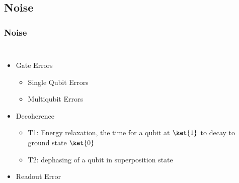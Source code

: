 \documentclass[aspectratio=169,11pt,hyperref={colorlinks=true}]{beamer}
\begin{document}
\subsection{Noise}
\begin{frame}
    \frametitle{Noise}
    \begin{columns}
            \begin{itemize}
                \item Gate Errors
                    \begin{itemize}
                        \item Single Qubit Errors
                        \item Multiqubit Errors
                    \end{itemize}
                \item Decoherence
                    \begin{itemize}
                        \item T1: Energy relaxation, the time for a qubit at
                            $\ket{1}$ to decay to ground state $\ket{0}$
                        \item T2: dephasing of a qubit in superposition state
                    \end{itemize}
                \item Readout Error
            \end{itemize}
\end{columns}
\end{frame}
\end{document}
